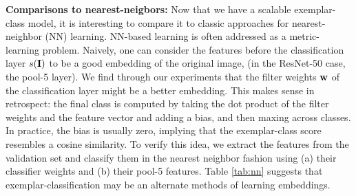 \documentclass[letterpaper]{article} %
\newcommand{\eg}{\textit{e.g.}}
\begin{document}
{\bf Comparisons to nearest-neigbors:} Now that we have a scalable exemplar-class model, it is interesting to compare it to classic approaches for nearest-neighbor (NN) learning. NN-based learning is often addressed as a metric-learning problem.
Naively, one can consider the features before the classification layer $s({\bf I})$ to be a good embedding of the original image, (in the ResNet-50 case, the pool-5 layer). We find through our experiments that the filter weights ${\bf w}$ of the classification layer might be a better embedding. %
This makes sense in retrospect: the final class is computed by taking the dot product of the filter weights and the feature vector and adding a bias, and then maxing across classes. %
In practice, the bias is usually zero, implying that the exemplar-class score resembles a cosine similarity.  To verify this idea, we extract the features from the validation set and classify them in the nearest neighbor fashion using (a) their classifier weights and (b) their pool-5 features.
Table \ref{tab:nn} suggests that exemplar-classification may be an alternate methods of learning embeddings. %

\end{document}

